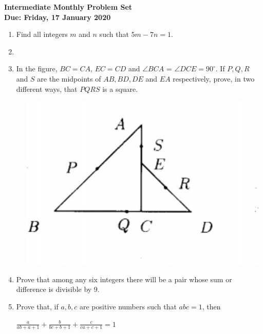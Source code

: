 \documentclass{article}
\begin{document}
\begin{center}
\textbf{\Large Intermediate Monthly Problem Set}
\\ \vspace{1em}
\textbf{\large Due: Friday, 17 January 2020}
\end{center}

\begin{enumerate}[1.]

\vspace{6pt}
\item %
Find all integers $m$ and $n$ such that $5m- 7n = 1$.

\vspace{6pt}
\item


\vspace{6pt}
\item
In the figure, $BC = CA$, $EC = CD$ and $\angle BCA$ = $\angle DCE = 90^{\circ}$. If $P, Q, R$ and $S$ are the
midpoints of $AB, BD, DE$ and
$EA$ respectively, prove, in two
different ways, that $PQRS$ is a
square.
\begin{center}
	\includegraphics[scale=0.5]{int_q5.jpg}
\end{center}


\vspace{6pt}
\item %
Prove that among any six integers there will be a pair whose sum
or difference is divisible by 9.

\vspace{6pt}
\item %
Prove that, if $a, b, c$ are positive numbers such that $abc= 1$, then
\begin{center}
	$\frac{a}{ab + a + 1} + \frac{b}{bc + b + 1} + \frac{c}{ca + c + 1} = 1$
\end{center}


\end{enumerate}
\end{document}
